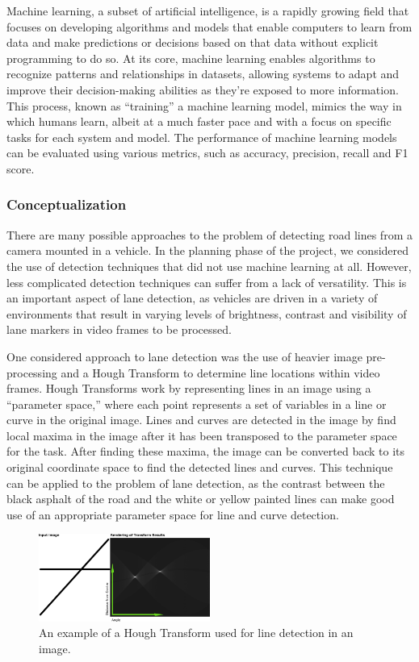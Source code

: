 \documentclass[titlepage]{article}
\begin{document}
Machine learning, a subset of artificial intelligence, is a rapidly growing field that focuses on developing algorithms and
models that enable computers to learn from data and make predictions or decisions based on that data without explicit programming
to do so.
At its core, machine learning enables algorithms to recognize patterns and relationships in datasets, allowing systems to adapt
and improve their decision-making abilities as they're exposed to more information.
This process, known as ``training'' a machine learning model, mimics the way in which humans learn, albeit at a much faster pace
and with a focus on specific tasks for each system and model.
The performance of machine learning models can be evaluated using various metrics, such as accuracy, precision, recall and F1
score.



\subsubsection{Conceptualization}

There are many possible approaches to the problem of detecting road lines from a camera mounted in a vehicle.
In the planning phase of the project, we considered the use of detection techniques that did not use machine learning at all.
However, less complicated detection techniques can suffer from a lack of versatility.
This is an important aspect of lane detection, as vehicles are driven in a variety of environments that result in varying
levels of brightness, contrast and visibility of lane markers in video frames to be processed.

One considered approach to lane detection was the use of heavier image pre-processing and a Hough Transform to determine line
locations within video frames.
Hough Transforms work by representing lines in an image using a ``parameter space,'' where each point represents a set of
variables in a line or curve in the original image.
Lines and curves are detected in the image by find local maxima in the image after it has been transposed to the parameter space
for the task.
After finding these maxima, the image can be converted back to its original coordinate space to find the detected lines and
curves.
This technique can be applied to the problem of lane detection, as the contrast between the black asphalt of the road and the
white or yellow painted lines can make good use of an appropriate parameter space for line and curve detection.

\begin{figure}
	\centering
	\includegraphics[width=0.5\textwidth]{Hough-example}
	\caption{An example of a Hough Transform used for line detection in an image.}
\end{figure}
\end{document}
